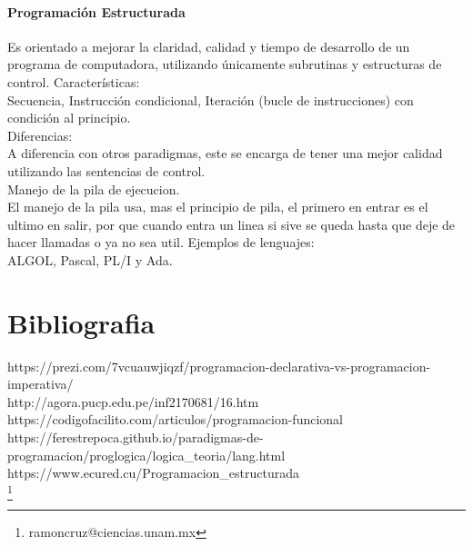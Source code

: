 \documentclass[12pt]{article}
\begin{document}
\paragraph{Programación Estructurada}
Es orientado a mejorar la claridad, calidad y tiempo de desarrollo de un programa de computadora, utilizando únicamente subrutinas y estructuras de control. Características:\\
Secuencia, Instrucción condicional, Iteración (bucle de instrucciones) con condición al principio.\\
Diferencias:\\
A diferencia con otros paradigmas, este se encarga de tener una mejor calidad utilizando las sentencias de control.\\
Manejo de la pila de ejecucion.\\
El manejo de la pila usa, mas el principio de pila, el primero en entrar es el ultimo en salir, por que cuando entra un linea si sive se queda hasta que deje de hacer llamadas o ya no sea util.
Ejemplos de lenguajes:\\
ALGOL, Pascal, PL/I y Ada.

\section{Bibliografia}
https://prezi.com/7vcuauwjiqzf/programacion-declarativa-vs-programacion-imperativa/\\
http://agora.pucp.edu.pe/inf2170681/16.htm\\
https://codigofacilito.com/articulos/programacion-funcional\\
https://ferestrepoca.github.io/paradigmas-de-programacion/proglogica/logica_teoria/lang.html\\
https://www.ecured.cu/Programacion_estructurada\\

\footnote{ramoncruz@ciencias.unam.mx}
\end{document}
